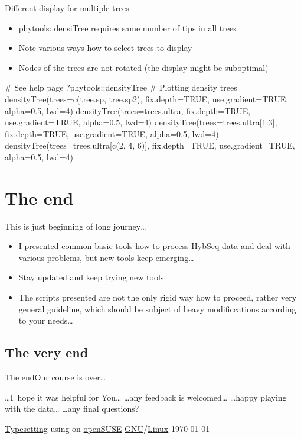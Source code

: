 \documentclass[compress, ucs, xelatex, 11pt, xcolor=x11names, aspectratio=169,
	hyperref={
		bookmarks=true,
		unicode=true,
		colorlinks=true,
		pdftitle={HybSeq course},
		plainpages=false,
		pdfauthor={Vojtech Zeisek},
		pdfsubject={Practical processing of HybSeq target enrichment sequencing data on computing grids like MetaCentrum},
		pdfcreator={XeLaTeX},
		pdfkeywords={BASH, command line, GNU, HybSeq, Linux, MetaCentrum, sequencing shell, target enrichment},
		linkcolor=Turquoise4, %
		anchorcolor=DodgerBlue4, %
		citecolor=DodgerBlue4, %
		filecolor=DodgerBlue4, %
		menucolor=Tan4, %
		urlcolor=DarkOliveGreen4, %
		pdftex},
	url={hyphens, lowtilde} %
	]{beamer}
\renewcommand{\texttt}[1]{\colorbox{Cornsilk2}{{\ttfamily #1}}}
\begin{document}
\begin{frame}[fragile]{Different display for multiple trees}
	\begin{itemize}
		\item \texttt{phytools::densiTree} requires same number of tips in all trees
		\item Note various ways how to select trees to display
		\item Nodes of the trees are not rotated (the display might be suboptimal)
	\end{itemize}
	\begin{spluscode}
    # See help page
    ?phytools::densityTree
    # Plotting density trees
    densityTree(trees=c(tree.sp, tree.sp2), fix.depth=TRUE, use.gradient=TRUE,
      alpha=0.5, lwd=4)
    densityTree(trees=trees.ultra, fix.depth=TRUE, use.gradient=TRUE,
      alpha=0.5, lwd=4)
    densityTree(trees=trees.ultra[1:3], fix.depth=TRUE, use.gradient=TRUE,
      alpha=0.5, lwd=4)
    densityTree(trees=trees.ultra[c(2, 4, 6)], fix.depth=TRUE,
      use.gradient=TRUE, alpha=0.5, lwd=4)
	\end{spluscode}
\end{frame}

\section{The end}

\begin{frame}{This is just beginning of long journey\ldots}
	\begin{itemize}
		\item I presented common basic tools how to process HybSeq data and deal with various problems, but new tools keep emerging\ldots
		\item Stay updated and keep trying new tools
		\item The scripts presented are not the only rigid way how to proceed, rather very general guideline, which should be subject of heavy modificcations according to your needs\ldots
	\end{itemize}
\end{frame}

\subsection{The very end}

\begin{frame}{The end}{Our course is over\ldots}
	\begin{center}
		\ldots I~hope it was helpful for You\ldots
		\vfill
		\ldots any feedback is welcomed\ldots
		\vfill
		\ldots happy playing with the data\ldots
		\vfill
		\ldots any final questions?
		\vfill
	\end{center}
	\vfill
	\begin{flushright}
		\begin{tiny}
		\href{https://en.wikipedia.org/wiki/XeTeX}{Typesetting} using \XeLaTeX{ }on \href{https://www.opensuse.org/}{openSUSE} \href{https://en.wikipedia.org/wiki/GNU}{GNU}/\href{https://en.wikipedia.org/wiki/Linux}{Linux} \today
		\end{tiny}
	\end{flushright}
\end{frame}
\end{document}
